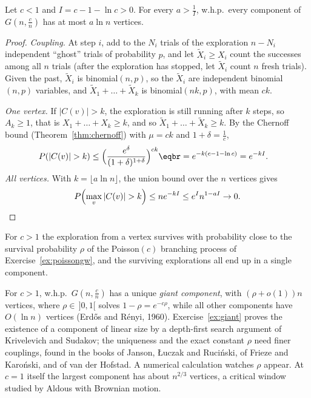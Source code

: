 \begin{theorem}\label{thm:subcritical}
Let $c<1$ and $I=c-1-\ln c>0$. For every $a>\frac1I$, w.h.p.\ every component of $G(n,\frac cn)$ has at most $a\ln n$ vertices.
\end{theorem}
\begin{proof}
\emph{Coupling.} At step $i$, add to the $N_i$ trials of the exploration $n-N_i$ independent ``ghost'' trials of probability $p$, and let $\tilde X_i\ge X_i$ count the
successes among all $n$ trials (after the exploration has stopped, let $\tilde X_i$ count $n$ fresh trials). Given the past, $\tilde X_i$ is binomial$(n,p)$, so the $\tilde X_i$
are independent binomial$(n,p)$ variables, and $\tilde X_1+\dots+\tilde X_k$ is binomial$(nk,p)$, with mean $ck$.

\emph{One vertex.} If $|C(v)|>k$, the exploration is still running after $k$ steps, so $A_k\ge1$, that is $X_1+\dots+X_k\ge k$, and so $\tilde X_1+\dots+\tilde X_k\ge k$. By the
Chernoff bound (Theorem~\ref{thm:chernoff}) with $\mu=ck$ and $1+\delta=\frac1c$,
\[
\begin{aligned}P(|C(v)|>k)&\le\Bigl(\frac{e^\delta}{(1+\delta)^{1+\delta}}\Bigr)^{ck}\eqbr=e^{-k(c-1-\ln c)}=e^{-kI}.\end{aligned}
\]
\emph{All vertices.} With $k=\lfloor a\ln n\rfloor$, the union bound over the $n$ vertices gives
\[
P\Bigl(\max_v|C(v)|>k\Bigr)\le ne^{-kI}\le e^In^{1-aI}\to0.
\]
\end{proof}

For $c>1$ the exploration from a vertex survives with probability close to the survival probability $\rho$ of the Poisson$(c)$ branching
process of Exercise~\ref{ex:poissongw}, and the surviving explorations all end up in a single component.

\begin{remark}
For $c>1$, w.h.p.\ $G(n,\frac cn)$ has a unique \emph{giant component}, with $(\rho+o(1))n$ vertices, where $\rho\in\,]0,1[$ solves $1-\rho=e^{-c\rho}$, while all other
components have $O(\ln n)$ vertices (Erd\H os and R\'enyi, 1960). Exercise~\ref{ex:giant} proves the existence of a component of linear size by a
depth-first search argument of Krivelevich and Sudakov; the uniqueness and the exact constant $\rho$ need finer couplings, found in
the books of Janson, \L uczak and Ruci\'nski, of Frieze and Karo\'nski, and of van der Hofstad. A numerical calculation watches $\rho$ appear. At $c=1$
itself the largest component has about $n^{2/3}$ vertices, a critical window studied by Aldous with Brownian motion.
\end{remark}


